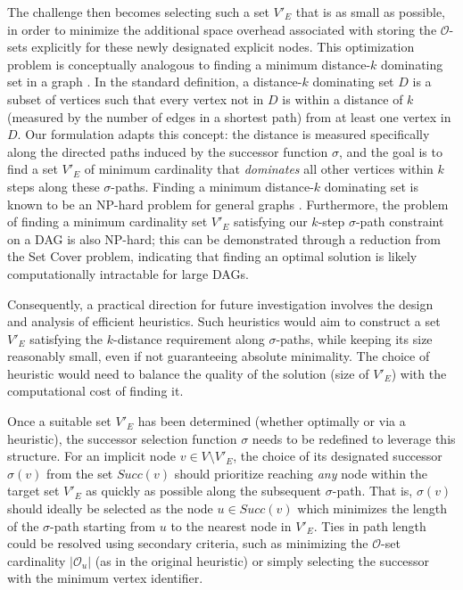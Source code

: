 The challenge then becomes selecting such a set $V'_E$ that is as small as possible, in order to minimize the additional space overhead associated with storing the $\mathcal{O}$-sets explicitly for these newly designated explicit nodes. This optimization problem is conceptually analogous to finding a minimum distance-$k$ dominating set in a graph \cite{haynes2013fundamentals}. In the standard definition, a distance-$k$ dominating set $D$ is a subset of vertices such that every vertex not in $D$ is within a distance of $k$ (measured by the number of edges in a shortest path) from at least one vertex in $D$. Our formulation adapts this concept: the distance is measured specifically along the directed paths induced by the successor function $\sigma$, and the goal is to find a set $V'_E$ of minimum cardinality that \emph{dominates} all other vertices within $k$ steps along these $\sigma$-paths. Finding a minimum distance-$k$ dominating set is known to be an NP-hard problem for general graphs \cite{haynes2013fundamentals}. Furthermore, the problem of finding a minimum cardinality set $V'_E$ satisfying our $k$-step $\sigma$-path constraint on a DAG is also NP-hard; this can be demonstrated through a reduction from the Set Cover problem, indicating that finding an optimal solution is likely computationally intractable for large DAGs.

Consequently, a practical direction for future investigation involves the design and analysis of efficient heuristics. Such heuristics would aim to construct a set $V'_E$ satisfying the $k$-distance requirement along $\sigma$-paths, while keeping its size reasonably small, even if not guaranteeing absolute minimality. The choice of heuristic would need to balance the quality of the solution (size of $V'_E$) with the computational cost of finding it.

Once a suitable set $V'_E$ has been determined (whether optimally or via a heuristic), the successor selection function $\sigma$ needs to be redefined to leverage this structure. For an implicit node $v \in V \setminus V'_E$, the choice of its designated successor $\sigma(v)$ from the set $Succ(v)$ should prioritize reaching \emph{any} node within the target set $V'_E$ as quickly as possible along the subsequent $\sigma$-path. That is, $\sigma(v)$ should ideally be selected as the node $u \in Succ(v)$ which minimizes the length of the $\sigma$-path starting from $u$ to the nearest node in $V'_E$. Ties in path length could be resolved using secondary criteria, such as minimizing the $\mathcal{O}$-set cardinality $|\mathcal{O}_u|$ (as in the original heuristic) or simply selecting the successor with the minimum vertex identifier.

